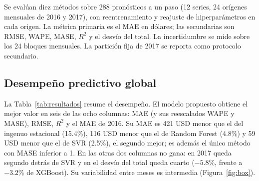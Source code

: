 \documentclass[pdflatex,sn-mathphys-num]{sn-jnl}
\begin{document}
Se evalúan diez métodos sobre 288 pronósticos a un paso (12 series, 24 orígenes mensuales de 2016 y 2017), con reentrenamiento y reajuste de hiperparámetros en cada origen. La métrica primaria es el MAE en dólares; las secundarias son RMSE, WAPE, MASE, $R^2$ y el desvío del total. La incertidumbre se mide sobre los 24 bloques mensuales. La partición fija de 2017 se reporta como protocolo secundario.

\subsection{Desempeño predictivo global}\label{subsec:global}

La Tabla~\ref{tab:resultados} resume el desempeño. El modelo propuesto obtiene el mejor valor en seis de las ocho columnas: MAE (y sus reescalados WAPE y MASE), RMSE, $R^2$ y el MAE de 2016. Su MAE es 421 USD menor que el del ingenuo estacional (15.4\%), 116 USD menor que el de Random Forest (4.8\%) y 59 USD menor que el de SVR (2.5\%), el segundo mejor; es además el único método con MASE inferior a 1. En las otras dos columnas no gana: en 2017 queda segundo detrás de SVR y en el desvío del total queda cuarto ($-5.8$\%, frente a $-3.2$\% de XGBoost). Su variabilidad entre meses es intermedia (Figura~\ref{fig:box}).
\end{document}
